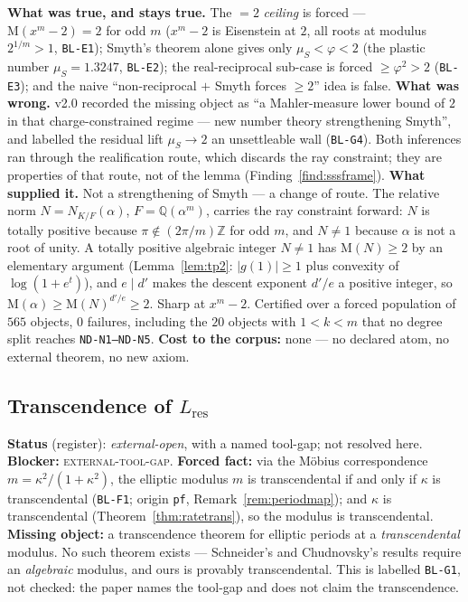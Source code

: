 \documentclass[11pt]{article}
\newcommand{\hx}[1]{\textcolor{cC}{\footnotesize\texttt{#1}}}
\newcommand{\Q}{\mathbb{Q}}
\newcommand{\Z}{\mathbb{Z}}
\newcommand{\gp}{\varphi}
\newcommand{\M}{\mathrm{M}}
\theoremstyle{plain}
\theoremstyle{definition}
\theoremstyle{remark}
\begin{document}
\smallskip\noindent
\textbf{What was true, and stays true.} The $=2$ \emph{ceiling} is forced ---
$\M(x^m-2)=2$ for odd $m$ ($x^m-2$ is Eisenstein at $2$, all roots at modulus
$2^{1/m}>1$, \hx{BL-E1}); Smyth's theorem alone gives only $\mu_S<\gp<2$ (the
plastic number $\mu_S=1.3247$, \hx{BL-E2}); the real-reciprocal sub-case is
forced $\ge\gp^2>2$ (\hx{BL-E3}); and the naive ``non-reciprocal $+$ Smyth
forces $\ge2$'' idea is false. \textbf{What was wrong.} v2.0 recorded the
missing object as ``a Mahler-measure lower bound of $2$ in that
charge-constrained regime --- new number theory strengthening Smyth'', and
labelled the residual lift $\mu_S\to2$ an unsettleable wall (\hx{BL-G4}). Both
inferences ran through the realification route, which discards the ray
constraint; they are properties of that route, not of the lemma
(Finding~\ref{find:sssframe}). \textbf{What supplied it.} Not a strengthening of
Smyth --- a change of route. The relative norm $N=N_{K/F}(\alpha)$,
$F=\Q(\alpha^m)$, carries the ray constraint forward: $N$ is totally positive
because $\pi\notin(2\pi/m)\Z$ for odd $m$, and $N\neq1$ because $\alpha$ is not
a root of unity. A totally positive algebraic integer $N\neq1$ has $\M(N)\ge2$
by an elementary argument (Lemma~\ref{lem:tp2}: $|g(1)|\ge1$ plus convexity of
$\log(1+e^t)$), and $e\mid d'$ makes the descent exponent $d'/e$ a positive
integer, so $\M(\alpha)\ge\M(N)^{d'/e}\ge2$. Sharp at $x^m-2$. Certified over a
forced population of $565$ objects, $0$ failures, including the $20$ objects with
$1<k<m$ that no degree split reaches \hx{ND-N1--ND-N5}. \textbf{Cost to the
corpus:} none --- no declared atom, no external theorem, no new axiom.

\subsection{Transcendence of \texorpdfstring{$L_{\mathrm{res}}$}{L\_res}}\label{blk:lrestrans}
\textbf{Status} (register): \emph{external-open}, with a named tool-gap; not
resolved here. \textbf{Blocker:} \textsc{external-tool-gap}. \textbf{Forced
fact:} via the M\"obius correspondence $m=\kappa^2/(1+\kappa^2)$, the elliptic
modulus $m$ is transcendental if and only if $\kappa$ is transcendental
(\hx{BL-F1}; origin \texttt{pf}, Remark~\ref{rem:periodmap}); and $\kappa$ is
transcendental (Theorem~\ref{thm:ratetrans}), so the modulus is transcendental.
\textbf{Missing object:} a transcendence theorem for elliptic periods at a
\emph{transcendental} modulus. No such theorem exists --- Schneider's and
Chudnovsky's results require an \emph{algebraic} modulus, and ours is provably
transcendental. This is labelled \hx{BL-G1}, not checked: the paper names the
tool-gap and does not claim the transcendence.
\end{document}
